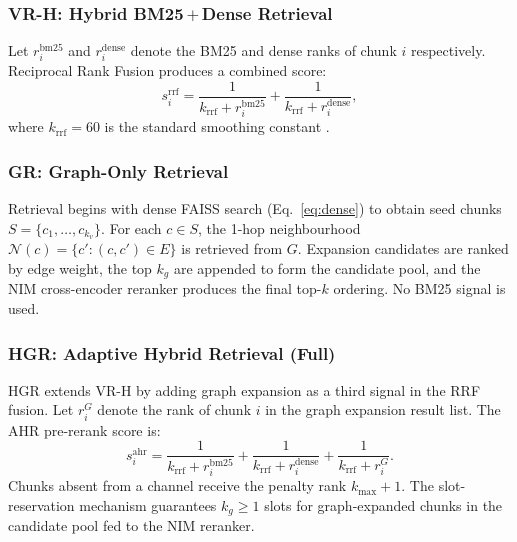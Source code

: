 \documentclass[journal]{IEEEtran}
\begin{document}
\subsubsection*{VR-H: Hybrid BM25\,$+$\,Dense Retrieval}
Let $r_i^{\mathrm{bm25}}$ and $r_i^{\mathrm{dense}}$ denote the BM25
and dense ranks of chunk $i$ respectively. Reciprocal Rank Fusion
produces a combined score:
\begin{equation}
  s_i^{\mathrm{rrf}} = \frac{1}{k_\text{rrf} + r_i^{\mathrm{bm25}}}
                     + \frac{1}{k_\text{rrf} + r_i^{\mathrm{dense}}},
  \label{eq:rrf}
\end{equation}
where $k_\text{rrf} = 60$ is the standard smoothing constant
\cite{cormack2009rrf}.

\subsubsection*{GR: Graph-Only Retrieval}
Retrieval begins with dense FAISS search (Eq.~\ref{eq:dense}) to
obtain seed chunks $S = \{c_1, \ldots, c_{k_v}\}$. For each
$c \in S$, the 1-hop neighbourhood $\mathcal{N}(c) = \{c': (c,c')\in
E\}$ is retrieved from $G$. Expansion candidates are ranked by edge
weight, the top $k_g$ are appended to form the candidate pool, and
the NIM cross-encoder reranker produces the final top-$k$ ordering.
No BM25 signal is used.

\subsubsection*{HGR: Adaptive Hybrid Retrieval (Full)}
HGR extends VR-H by adding graph expansion as a third signal in the
RRF fusion. Let $r_i^{G}$ denote the rank of chunk $i$ in the graph
expansion result list. The AHR pre-rerank score is:
\begin{equation}
  s_i^{\mathrm{ahr}} = \frac{1}{k_\text{rrf} + r_i^{\mathrm{bm25}}}
                     + \frac{1}{k_\text{rrf} + r_i^{\mathrm{dense}}}
                     + \frac{1}{k_\text{rrf} + r_i^{G}}.
  \label{eq:ahr}
\end{equation}
Chunks absent from a channel receive the penalty rank $k_{\max}+1$.
The slot-reservation mechanism guarantees $k_g \geq 1$ slots for
graph-expanded chunks in the candidate pool fed to the NIM reranker.
\end{document}
